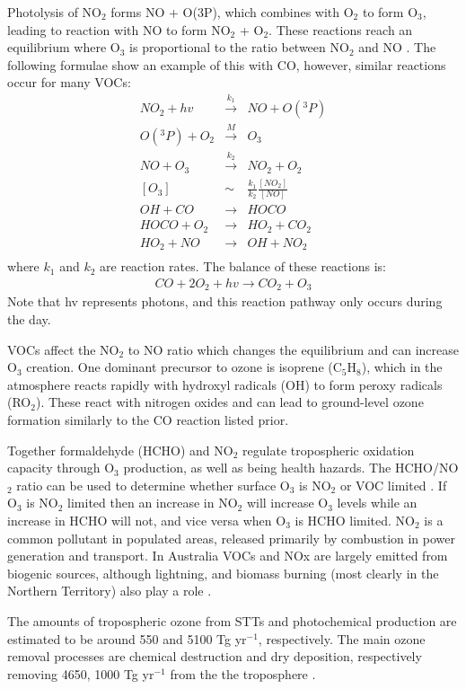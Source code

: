 Photolysis of NO$_2$ forms NO + O(3P), which combines with O$_2$ to form O$_3$, leading to reaction with NO to form NO$_2$ + O$_2$.
These reactions reach an equilibrium where O$_3$ is proportional to the ratio between NO$_2$ and NO \cite{Sillman_2002}.
The following formulae show an example of this with CO, however, similar reactions occur for many VOCs:
\begin{eqnarray*}
NO_2 + hv &\overset{k_1}{\rightarrow}& NO + O({}^3 P) \\
O({}^3 P) + O_2 &\overset{M}{\rightarrow}& O_3 \\
NO + O_3 &\overset{k_2}{\rightarrow}& NO_2 + O_2 \\
\left[O_3\right] &\sim& \frac{k_1}{k_2} \frac{\left[NO_2\right]}{\left[NO\right]} \\
OH + CO &{\rightarrow}& HOCO \\
HOCO + O_2 &{\rightarrow}& HO_2 + CO_2 \\
HO_2 + NO &{\rightarrow}& OH + NO_2 \\
\end{eqnarray*}
where $k_1$ and $k_2$ are reaction rates.
The balance of these reactions is:
\begin{eqnarray*} CO + 2O_2 + hv {\rightarrow} CO_2 + O_3 \end{eqnarray*}
Note that hv represents photons, and this reaction pathway only occurs during the day.

VOCs affect the NO$_2$ to NO ratio which changes the equilibrium and can increase O$_3$ creation.
One dominant precursor to ozone is isoprene (C$_5$H$_8$), which in the atmosphere reacts rapidly with hydroxyl radicals (OH) to form peroxy radicals (RO$_2$).
These react with nitrogen oxides and can lead to ground-level ozone formation similarly to the CO reaction listed prior.

Together formaldehyde (HCHO) and NO$_2$ regulate tropospheric oxidation capacity through O$_3$ production, as well as being health hazards.
The HCHO/NO$_2$ ratio can be used to determine whether surface O$_3$ is NO$_2$ or VOC limited \cite{Mahajan_2015}.
If O$_3$ is NO$_2$ limited then an increase in NO$_2$ will increase O$_3$ levels while an increase in HCHO will not, and vice versa when O$_3$ is HCHO limited.
NO$_2$ is a common pollutant in populated areas, released primarily by combustion in power generation and transport. 
In Australia VOCs and NOx are largely emitted from biogenic sources, although lightning, and biomass burning (most clearly in the Northern Territory) also play a role \cite{Guenther_2006, VanDerA_2008}.

The amounts of tropospheric ozone from STTs and photochemical production are estimated to be around 550 and 5100 Tg yr$^{-1}$, respectively. 
The main ozone removal processes are chemical destruction and dry deposition, respectively removing 4650, 1000 Tg yr$^{-1}$ from the the troposphere \cite{Stevenson_2006}.